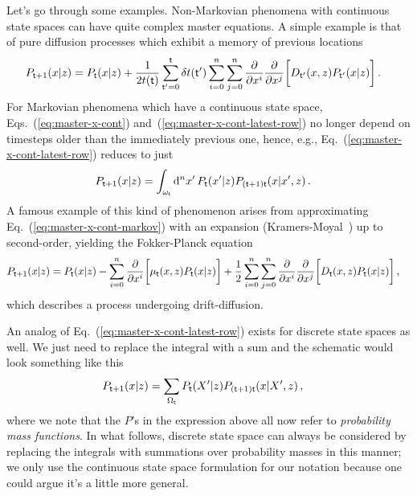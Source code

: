 Let's go through some examples. Non-Markovian phenomena with continuous state spaces can have quite complex master equations. A simple example is that of pure diffusion processes which exhibit a memory of previous locations
\begin{align}
P_{{\sf t}+1}(x\vert z) &= P_{{\sf t}}(x\vert z) + \frac{1}{2t({\sf t})}\sum_{{\sf t}'=0}^{{\sf t}}\delta t ({\sf t}')\sum_{i=0}^n\sum_{j=0}^n\frac{\partial}{\partial x^i}\frac{\partial}{\partial x^j}\bigg[ D_{{\sf t}'}(x,z)P_{{\sf t}'}(x\vert z) \bigg] \,.
\end{align}
For Markovian phenomena which have a continuous state space, Eqs.~(\ref{eq:master-x-cont}) and~(\ref{eq:master-x-cont-latest-row}) no longer depend on timesteps older than the immediately previous one, hence, e.g., Eq.~(\ref{eq:master-x-cont-latest-row}) reduces to just
\begin{align}
P_{{\sf t}+1}(x\vert z) &= \int_{\omega_{\sf t}}{\rm d}^nx' \, P_{\sf t}(x'\vert z) P_{({\sf t}+1){\sf t}}(x\vert x',z) \label{eq:master-x-cont-markov} \,.
\end{align}
A famous example of this kind of phenomenon arises from approximating Eq.~(\ref{eq:master-x-cont-markov}) with an expansion (Kramers-Moyal~\cite{kramers1940brownian, moyal1949stochastic}) up to second-order, yielding the Fokker-Planck equation 
\begin{align}
P_{{\sf t}+1}(x\vert z) &= P_{{\sf t}}(x\vert z) - \sum_{i=0}^n\frac{\partial}{\partial x^i}\bigg[ \mu_{{\sf t}}(x,z)P_{{\sf t}}(x\vert z)\bigg] + \frac{1}{2}\sum_{i=0}^n\sum_{j=0}^n\frac{\partial}{\partial x^i}\frac{\partial}{\partial x^j}\bigg[ D_{{\sf t}}(x,z)P_{{\sf t}}(x\vert z) \bigg] \,,
\end{align}
which describes a process undergoing drift-diffusion.

An analog of Eq.~(\ref{eq:master-x-cont-latest-row}) exists for discrete state spaces as well. We just need to replace the integral with a sum and the schematic would look something like this
\begin{align}
P_{{\sf t}+1}(x\vert z) &= \sum_{\Omega_{{\sf t}}} P_{{\sf t}}(X'\vert z) P_{({\sf t}+1){\sf t}}(x \vert X', z) \label{eq:master-x-disc} \,,
\end{align}
where we note that the $P$'s in the expression above all now refer to \emph{probability mass functions}. In what follows, discrete state space can always be considered by replacing the integrals with summations over probability masses in this manner; we only use the continuous state space formulation for our notation because one could argue it's a little more general. 

